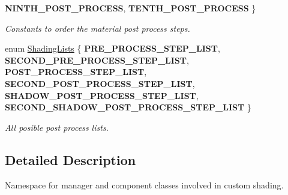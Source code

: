 \begin{DoxyCompactItemize}
\newline
{\bfseries N\+I\+N\+T\+H\+\_\+\+P\+O\+S\+T\+\_\+\+P\+R\+O\+C\+E\+SS}, 
{\bfseries T\+E\+N\+T\+H\+\_\+\+P\+O\+S\+T\+\_\+\+P\+R\+O\+C\+E\+SS}
 \}
\begin{DoxyCompactList}\small\item\em Constants to order the material post process steps. \end{DoxyCompactList}\item 
\mbox{\label{namespace_geometry_engine_1_1_custom_shading_a9bfcbfb6d734e4d6fb8e2c661b987db6}} 
enum \mbox{\hyperlink{namespace_geometry_engine_1_1_custom_shading_a9bfcbfb6d734e4d6fb8e2c661b987db6}{Shading\+Lists}} \{ \newline
{\bfseries P\+R\+E\+\_\+\+P\+R\+O\+C\+E\+S\+S\+\_\+\+S\+T\+E\+P\+\_\+\+L\+I\+ST}, 
{\bfseries S\+E\+C\+O\+N\+D\+\_\+\+P\+R\+E\+\_\+\+P\+R\+O\+C\+E\+S\+S\+\_\+\+S\+T\+E\+P\+\_\+\+L\+I\+ST}, 
{\bfseries P\+O\+S\+T\+\_\+\+P\+R\+O\+C\+E\+S\+S\+\_\+\+S\+T\+E\+P\+\_\+\+L\+I\+ST}, 
{\bfseries S\+E\+C\+O\+N\+D\+\_\+\+P\+O\+S\+T\+\_\+\+P\+R\+O\+C\+E\+S\+S\+\_\+\+S\+T\+E\+P\+\_\+\+L\+I\+ST}, 
\newline
{\bfseries S\+H\+A\+D\+O\+W\+\_\+\+P\+O\+S\+T\+\_\+\+P\+R\+O\+C\+E\+S\+S\+\_\+\+S\+T\+E\+P\+\_\+\+L\+I\+ST}, 
{\bfseries S\+E\+C\+O\+N\+D\+\_\+\+S\+H\+A\+D\+O\+W\+\_\+\+P\+O\+S\+T\+\_\+\+P\+R\+O\+C\+E\+S\+S\+\_\+\+S\+T\+E\+P\+\_\+\+L\+I\+ST}
 \}
\begin{DoxyCompactList}\small\item\em All posible post process lists. \end{DoxyCompactList}\end{DoxyCompactItemize}


\subsection{Detailed Description}
Namespace for manager and component classes involved in custom shading. 